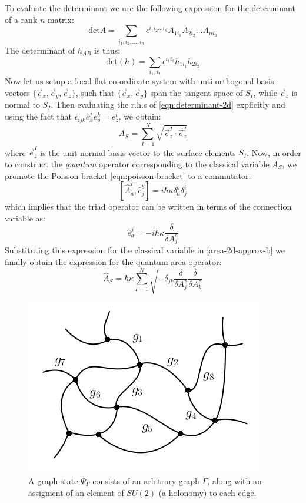 \documentclass[submission, Phys]{SciPost}
\begin{document}
To evaluate the determinant we use the following expression for the determinant of a rank $ n $ matrix:
\begin{equation}\label{eqn:determinant}
	\text{det} A = \sum_{i_1, i_2, \ldots,i_n} \epsilon^{i_1 i_2 \ldots i_n} A_{1 i_1} A_{2 i_2}\ldots A_{n i_n}
\end{equation}
The determinant of $ h_{AB} $ is thus:
\begin{equation}\label{eqn:determinant-2d}
	\text{det} (h) = \sum_{i_1,i_2} \epsilon^{i_1 i_2} h_{1 i_1} h_{2 i_2}
\end{equation}
Now let us setup a local flat co-ordinate system with unti orthogonal basis vectors $ \{\vec{e}_x, \vec{e}_y, \vec{e}_z\} $, such that $ \{ \vec{e}_x, \vec{e}_y \} $ span the tangent space of $ S_I $, while $ \vec{e}_z $ is normal to $ S_I $. Then evaluating the r.h.s of \eqref{eqn:determinant-2d} explicitly and using the fact that $ \epsilon_{ijk} e_x^j e_y^k = e_z^i $, we obtain:
\begin{equation}\label{area-2d-approx-b}
	A_S = \sum_{I=1}^N \sqrt{\vec{e}^I_z \cdot \vec{e}^I_z}
\end{equation}
where $ \vec{e}^I_z $ is the unit normal basis vector to the surface elements $ S_I $. Now, in order to construct the \emph{quantum} operator corresponding to the classical variable $ A_S $, we promote the Poisson bracket \eqref{eqn:poisson-bracket} to a commutator:
\begin{equation}\label{eqn:lqg-commutator}
[ \hat A_a^i, \hat e^b_j ] = i \hbar \kappa \delta^b_a \delta^i_j
\end{equation}
which implies that the triad operator can be written in terms of the connection variable as:
\begin{equation}\label{eqn:triad-operator}
	\hat e_a^j = -i\hbar \kappa \frac{\delta}{\delta A^a_j}
\end{equation}
Substituting this expression for the classical variable in \eqref{area-2d-approx-b} we finally obtain the expression for the quantum area operator:
\begin{equation}\label{eqn:area-quantum}
	\hat A_S = \hbar \kappa \sum_{I=1}^N \sqrt{ - \delta_{jk} \frac{\delta}{\delta A^z_j} \frac{\delta}{\delta A^z_k}} 
\end{equation}

\begin{figure}[tbph]
\centering
\includegraphics[width=0.4\linewidth]{network-labelled-g}
\caption{A graph state $ \Psi_\Gamma $ consists of an arbitrary graph $ \Gamma $, along with an assigment of an element of $ SU(2) $ (a holonomy) to each edge.}
\label{fig:graph-state}
\end{figure}
\end{document}
